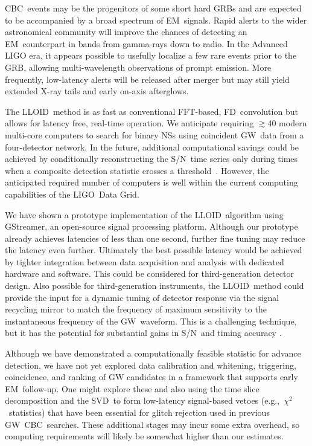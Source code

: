 \documentclass[preprint2]{aastex}
\newcommand{\NS}{NS}
\newcommand{\GW}{GW}%
\newcommand{\EM}{EM}%
\newcommand{\GRB}{GRB}%
\newcommand{\CBC}{CBC}%
\newcommand{\LIGO}{LIGO}%
\newcommand{\SNR}{S/N}%
\newcommand{\SVD}{SVD}%
\newcommand{\fft}{FFT}%
\newcommand{\gstreamer}{GStreamer}
\newcommand{\lloid}{LLOID}%
\newcommand{\FD}{FD}%
\begin{document}
\CBC\ events may be the progenitors of some short hard \GRB{}s and are expected
to be accompanied by a broad spectrum of \EM\ signals. Rapid alerts to the
wider astronomical community will improve the chances of detecting an \EM\
counterpart in bands from gamma-rays down to radio. In the Advanced LIGO
era, it appears possible to usefully localize a few rare events prior to the
\GRB{}, allowing multi-wavelength observations of prompt emission. More
frequently, low-latency alerts will be released after merger but may still
yield extended X-ray tails and early on-axis afterglows.

The \lloid\ method is as fast as conventional \fft-based, \FD\ convolution but allows for
latency free, real-time operation.  We anticipate requiring $\gtrsim$40
modern multi-core computers to search for binary \NS{}s using
coincident \GW\ data from a four-detector network.  In the future, additional
computational savings could be achieved by conditionally reconstructing the
\SNR\ time series only during times when a composite detection statistic
crosses a threshold~\citep{svd-compdetstat}.  However, the anticipated required
number of computers is well within the current computing capabilities of the
\LIGO\ Data Grid.

We have shown a prototype implementation of the \lloid\ algorithm using
\gstreamer, an open-source signal processing platform.  Although our prototype
already achieves latencies of less than one second, further fine tuning may
reduce the latency even further.  Ultimately the best
possible latency would be achieved by tighter integration between data
acquisition and analysis with dedicated hardware and software. This could be
considered for third-generation detector design.  Also possible for
third-generation instruments, the \lloid\ method could provide the input for a
dynamic tuning of detector response via the signal recycling mirror to match
the frequency of maximum sensitivity to the instantaneous frequency of the
\GW\ waveform.  This is a challenging technique, but it has the potential for
substantial gains in \SNR\ and timing accuracy \citep{PhysRevD.47.2184}.

Although we have demonstrated a computationally feasible statistic
for advance detection, we have not yet explored data calibration and whitening,
triggering, coincidence, and ranking of GW candidates in a
framework that supports early \EM\ follow-up.  One might explore these and also
using the time slice decomposition and the \SVD\ to form low-latency
signal-based vetoes (e.g.,~$\chi^2$~statistics) that have been essential for
glitch rejection used in previous \GW\ \CBC\ searches.  These additional stages
may incur some extra overhead, so computing requirements will likely be somewhat
higher than our estimates.
\end{document}
